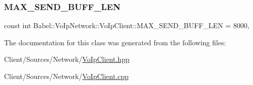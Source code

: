 \subsubsection{\texorpdfstring{M\+A\+X\+\_\+\+S\+E\+N\+D\+\_\+\+B\+U\+F\+F\+\_\+\+L\+EN}{MAX\_SEND\_BUFF\_LEN}}
{\footnotesize\ttfamily const int Babel\+::\+Vo\+Ip\+Network\+::\+Vo\+Ip\+Client\+::\+M\+A\+X\+\_\+\+S\+E\+N\+D\+\_\+\+B\+U\+F\+F\+\_\+\+L\+EN = 8000\hspace{0.3cm}{\ttfamily [static]}, {\ttfamily [protected]}}



The documentation for this class was generated from the following files\+:\begin{DoxyCompactItemize}
\item 
Client/\+Sources/\+Network/\hyperlink{VoIpClient_8hpp}{Vo\+Ip\+Client.\+hpp}\item 
Client/\+Sources/\+Network/\hyperlink{VoIpClient_8cpp}{Vo\+Ip\+Client.\+cpp}\end{DoxyCompactItemize}
